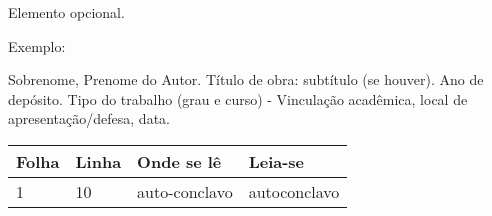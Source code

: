 
\begin{errata}
Elemento opcional. 

Exemplo:

\vspace{\onelineskip}

Sobrenome, Prenome do Autor. Título de obra: subtítulo (se houver). Ano de depósito. Tipo do trabalho (grau e curso) - Vinculação acadêmica, local de apresentação/defesa, data.

\begin{table}[htb]
\center
\begin{tabular}{|p{2.4cm}|p{2cm}|p{3cm}|p{3cm}|}
  \hline
   \textbf{Folha} & \textbf{Linha}  & \textbf{Onde se lê}  & \textbf{Leia-se}  \\
    \hline
    1 & 10 & auto-conclavo & autoconclavo\\
   \hline
\end{tabular}
\end{table}

\end{errata}
